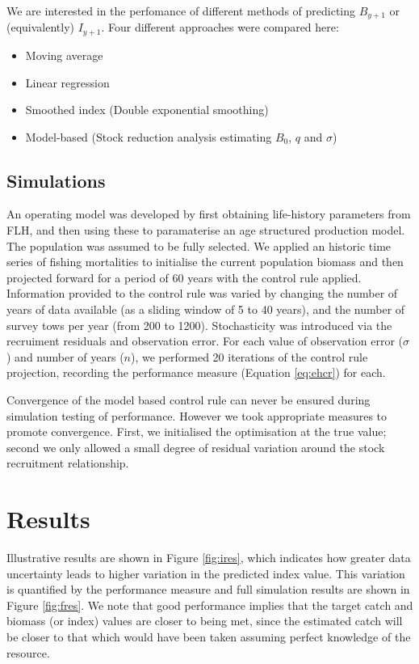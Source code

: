 \documentclass[11pt]{article} %
\begin{document}
We are interested in the perfomance of different methods of predicting $B_{y+1}$ or (equivalently) $I_{y+1}$. Four different approaches were compared here:
\begin{itemize}
\item Moving average
\item Linear regression
\item Smoothed index (Double exponential smoothing)
\item Model-based (Stock reduction analysis estimating $B_0$, $q$ and $\sigma$)
\end{itemize}


\subsection{Simulations}

An operating model was developed by first obtaining life-history parameters from FLH, and then using these to paramaterise an age structured production model. The population was assumed to be fully selected. We applied an historic time series of fishing mortalities to initialise the current population biomass and then projected forward for a period of 60 years with the control rule applied. Information provided to the control rule was varied by changing the number of years of data available (as a sliding window of 5 to 40 years), and the number of survey tows per year (from 200 to 1200). Stochasticity was introduced via the recruiment residuals and observation error. For each value of observation error ($\sigma$) and number of years ($n$), we performed 20 iterations of the control rule projection, recording the performance measure (Equation \ref{eq:ehcr}) for each.

Convergence of the model based control rule can never be ensured during simulation testing of performance. However we took appropriate measures to promote convergence. First, we initialised the optimisation at the true value; second we only allowed a small degree of residual variation around the stock recruitment relationship.

\section{Results}

Illustrative results are shown in Figure \ref{fig:ires}, which indicates how greater data uncertainty leads to higher variation in the predicted index value. This variation is quantified by the performance measure and full simulation results are shown in Figure \ref{fig:fres}. We note that good performance implies that the target catch and biomass (or index) values are closer to being met, since the estimated catch will be closer to that which would have been taken assuming perfect knowledge of the resource. 
\end{document}
